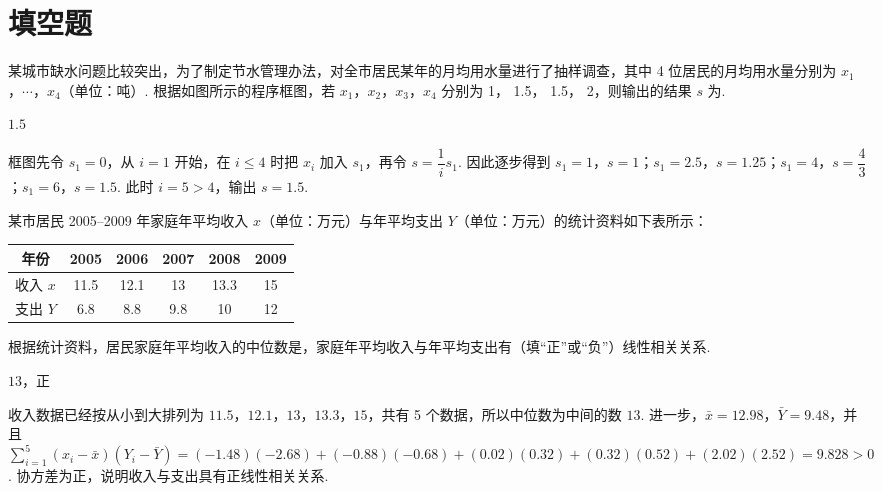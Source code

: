 \section{填空题}

\begin{problem}
某城市缺水问题比较突出，为了制定节水管理办法，对全市居民某年的月均用水量进行了抽样调查，其中 4 位居民的月均用水量分别为 \(x_1\)，\(\cdots\)，\(x_4\)（单位：吨）. 根据如图所示的程序框图，若 \(x_1\)，\(x_2\)，\(x_3\)，\(x_4\) 分别为 1， 1.5， 1.5， 2，则输出的结果 \(s\) 为\fillinblank{}.

\end{problem}

\begin{answer}
\(1.5\)
\end{answer}

\begin{solution}
框图先令 \(s_1=0\)，从 \(i=1\) 开始，在 \(i\le4\) 时把 \(x_i\) 加入 \(s_1\)，再令 \(s=\dfrac1i s_1\). 因此逐步得到
\(s_1=1\)，\(s=1\)；\(s_1=2.5\)，\(s=1.25\)；\(s_1=4\)，\(s=\dfrac43\)；\(s_1=6\)，\(s=1.5\). 此时 \(i=5>4\)，输出 \(s=1.5\).
\end{solution}

\begin{problem}
某市居民 2005--2009 年家庭年平均收入 \(x\)（单位：万元）与年平均支出 \(Y\)（单位：万元）的统计资料如下表所示：

\begin{center}
\begin{tabular}{c|ccccc}
年份 & 2005 & 2006 & 2007 & 2008 & 2009 \\
\hline
收入 \(x\) & 11.5 & 12.1 & 13 & 13.3 & 15 \\
支出 \(Y\) & 6.8 & 8.8 & 9.8 & 10 & 12
\end{tabular}
\end{center}

根据统计资料，居民家庭年平均收入的中位数是\fillinblank{}，家庭年平均收入与年平均支出有\fillinblank{}（填“正”或“负”）线性相关关系.
\end{problem}

\begin{answer}
\(13\)，正
\end{answer}

\begin{solution}
收入数据已经按从小到大排列为 \(11.5\)，\(12.1\)，\(13\)，\(13.3\)，\(15\)，共有 5 个数据，所以中位数为中间的数 \(13\). 进一步，\(\bar x=12.98\)，\(\bar Y=9.48\)，并且
\(\sum_{i=1}^5(x_i-\bar x)(Y_i-\bar Y)=(-1.48)(-2.68)+(-0.88)(-0.68)+(0.02)(0.32)+(0.32)(0.52)+(2.02)(2.52)=9.828>0\). 协方差为正，说明收入与支出具有正线性相关关系.
\end{solution}


